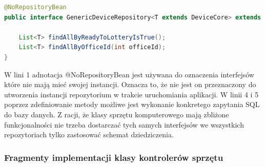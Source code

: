 \begin{lstlisting}[language=Java, style=JavaStyle,  caption={Generyczne repozytorium sprzętu komputerowego:  GenericDeviceRepository}, label={repo_genericDevice}]
@NoRepositoryBean
public interface GenericDeviceRepository<T extends DeviceCore> extends JpaRepository<T, Integer> {
    
    List<T> findAllByReadyToLotteryIsTrue();
    List<T> findAllByOfficeId(int officeId);
}
\end{lstlisting}

W lini 1 adnotacja @NoRepositoryBean jest używana do oznaczenia interfejsów które nie mają mieć swojej instancji. Oznacza to, że nie jest on przeznaczony do utworzenia instancji repozytorium w trakcie uruchomiania aplikacji. W linii 4 i 5 poprzez zdefiniowanie metody możliwe jest wykonanie konkretego zapytania SQL do bazy danych. Z racji, że klasy sprzętu komputerowego mają zbliżone funkcjonalności nie trzeba dostarczać tych samych interfejsów we wszystkich repozytoriach tylko zastosować schemat dziedziczenia.

\subsubsection{Fragmenty implementacji klasy kontrolerów sprzętu}

